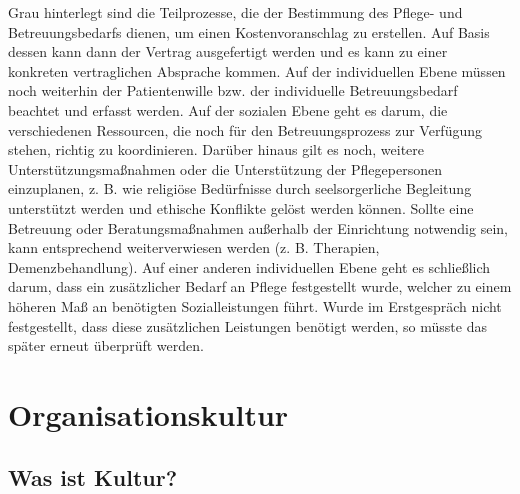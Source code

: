 \documentclass[
  letterpaper,
]{book}
\begin{document}
Grau hinterlegt sind die Teilprozesse, die der Bestimmung des Pflege-
und Betreuungsbedarfs dienen, um einen Kostenvoranschlag zu erstellen.
Auf Basis dessen kann dann der Vertrag ausgefertigt werden und es kann
zu einer konkreten vertraglichen Absprache kommen. Auf der individuellen
Ebene müssen noch weiterhin der Patientenwille bzw. der individuelle
Betreuungsbedarf beachtet und erfasst werden. Auf der sozialen Ebene
geht es darum, die verschiedenen Ressourcen, die noch für den
Betreuungsprozess zur Verfügung stehen, richtig zu koordinieren. Darüber
hinaus gilt es noch, weitere Unterstützungsmaßnahmen oder die
Unterstützung der Pflegepersonen einzuplanen, z. B. wie religiöse
Bedürfnisse durch seelsorgerliche Begleitung unterstützt werden und
ethische Konflikte gelöst werden können. Sollte eine Betreuung oder
Beratungsmaßnahmen außerhalb der Einrichtung notwendig sein, kann
entsprechend weiterverwiesen werden (z. B. Therapien, Demenzbehandlung).
Auf einer anderen individuellen Ebene geht es schließlich darum, dass
ein zusätzlicher Bedarf an Pflege festgestellt wurde, welcher zu einem
höheren Maß an benötigten Sozialleistungen führt. Wurde im Erstgespräch
nicht festgestellt, dass diese zusätzlichen Leistungen benötigt werden,
so müsste das später erneut überprüft werden.

\chapter{Organisationskultur}\label{organisationskultur}

\section{Was ist Kultur?}\label{was-ist-kultur}
\end{document}
